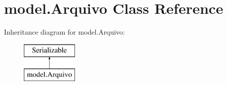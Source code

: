\hypertarget{classmodel_1_1_arquivo}{\section{model.\+Arquivo Class Reference}
\label{classmodel_1_1_arquivo}
}
Inheritance diagram for model.\+Arquivo\+:\begin{figure}[H]
\begin{center}
\leavevmode
\includegraphics[height=2.000000cm]{classmodel_1_1_arquivo}
\end{center}
\end{figure}
